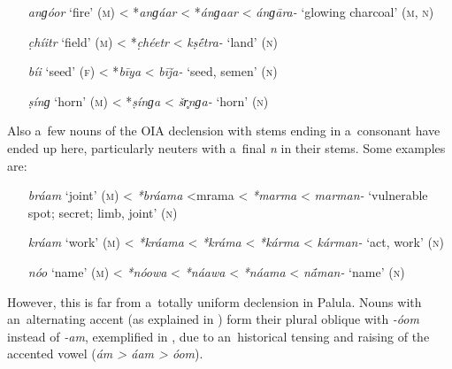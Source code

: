 \begin{itemize}[itemsep=0pt, leftmargin=]
\item[\textit{anɡóor} `fire' (\textsc{m})] {\textless} *\textit{anɡáar} {\textless} *\textit{ánɡaar} {\textless} \textit{ánɡāra-} `glowing charcoal' (\textsc{m}, \textsc{n})
\item[\textit{c̣híitr} `field' (\textsc{m})] {\textless} *\textit{c̣héetr} {\textless} \textit{kṣ\'{\={e}}tra-} `land' (\textsc{n})
\item[\textit{bíi} `seed' (\textsc{f})] {\textless} *\textit{bīya} {\textless} \textit{bīǰa-} `seed, semen' (\textsc{n})
\item[\textit{ṣínɡ} `horn' (\textsc{m})] {\textless} *\textit{ṣínɡa} {\textless} \textit{šr̥nɡa-} `horn' (\textsc{n})
\end{itemize}

Also a~few nouns of the OIA declension with stems ending in a~consonant have ended up here, particularly neuters with a~final \textit{n} in their stems. Some examples are: 

\begin{itemize}[itemsep=0pt, leftmargin=]
\item[\textit{bráam} `joint' (\textsc{m})] {\textless} \textit{*bráama} {\textless*mrama} {\textless} \textit{*marma} {\textless} \textit{marman-} `vulnerable spot; secret; limb, joint' (\textsc{n})
\item[\textit{kráam} `work' (\textsc{m})] {\textless} \textit{*kráama} {\textless} \textit{*kráma} {\textless} \textit{*kárma} {\textless} \textit{kárman-} `act, work' (\textsc{n}) 
\item[\textit{nóo} `name' (\textsc{m})] {\textless} \textit{*nóowa} {\textless} \textit{*náawa} {\textless} \textit{*náama} {\textless} \textit{n\'{\={a}}man-} `name' (\textsc{n})
\end{itemize}

However, this is far from a~totally uniform declension in Palula. Nouns with an~alternating accent (as explained in ) form their plural oblique with \textit{-óom} instead of \textit{-am}, exemplified in , due to an~historical tensing and raising of the accented vowel (\textit{ám {\textgreater} áam {\textgreater} óom}). 


